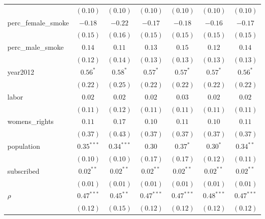 \begin{table}[!h]
\begin{center}
\begin{tabular}{l c c c c c c }
                        & $(0.10)$     & $(0.10)$     & $(0.10)$     & $(0.10)$     & $(0.10)$     & $(0.10)$     \\
perc\_female\_smoke     & $-0.18$      & $-0.22$      & $-0.17$      & $-0.18$      & $-0.16$      & $-0.17$      \\
                        & $(0.15)$     & $(0.16)$     & $(0.15)$     & $(0.15)$     & $(0.15)$     & $(0.15)$     \\
perc\_male\_smoke       & $0.14$       & $0.11$       & $0.13$       & $0.15$       & $0.12$       & $0.14$       \\
                        & $(0.12)$     & $(0.14)$     & $(0.13)$     & $(0.13)$     & $(0.13)$     & $(0.13)$     \\
year2012                & $0.56^{*}$   & $0.58^{*}$   & $0.57^{*}$   & $0.57^{*}$   & $0.57^{*}$   & $0.56^{*}$   \\
                        & $(0.22)$     & $(0.25)$     & $(0.22)$     & $(0.22)$     & $(0.22)$     & $(0.22)$     \\
labor                   & $0.02$       & $0.02$       & $0.02$       & $0.03$       & $0.02$       & $0.02$       \\
                        & $(0.11)$     & $(0.12)$     & $(0.11)$     & $(0.11)$     & $(0.11)$     & $(0.11)$     \\
womens\_rights          & $0.11$       & $0.17$       & $0.10$       & $0.11$       & $0.10$       & $0.11$       \\
                        & $(0.37)$     & $(0.43)$     & $(0.37)$     & $(0.37)$     & $(0.37)$     & $(0.37)$     \\
population              & $0.35^{***}$ & $0.34^{***}$ & $0.30$       & $0.37^{*}$   & $0.30^{*}$   & $0.34^{**}$  \\
                        & $(0.10)$     & $(0.10)$     & $(0.17)$     & $(0.17)$     & $(0.12)$     & $(0.11)$     \\
subscribed              & $0.02^{**}$  & $0.02^{**}$  & $0.02^{**}$  & $0.02^{**}$  & $0.02^{**}$  & $0.02^{**}$  \\
                        & $(0.01)$     & $(0.01)$     & $(0.01)$     & $(0.01)$     & $(0.01)$     & $(0.01)$     \\
$\rho$                  & $0.47^{***}$ & $0.45^{**}$  & $0.47^{***}$ & $0.47^{***}$ & $0.48^{***}$ & $0.47^{***}$ \\
                        & $(0.12)$     & $(0.15)$     & $(0.12)$     & $(0.12)$     & $(0.12)$     & $(0.12)$     \\

\end{tabular}
\end{center}
\end{table}
